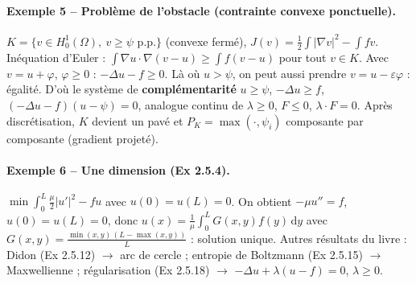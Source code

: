 \documentclass[10pt,a4paper]{article}
\newcommand{\eps}{\varepsilon}
\newcommand{\Hz}{H^1_0(\Omega)}
\begin{document}
\paragraph{Exemple 5 -- Problème de l'obstacle (contrainte convexe ponctuelle).}
$K=\{v\in\Hz,\ v\ge\psi\text{ p.p.}\}$ (convexe fermé), $J(v)=\frac12\int|\nabla v|^2-\int fv$.
Inéquation d'Euler : $\int\nabla u\cdot\nabla(v-u)\ge\int f(v-u)$ pour tout $v\in K$.
Avec $v=u+\varphi$, $\varphi\ge0$ : $-\Delta u-f\ge0$. Là où $u>\psi$, on peut aussi prendre $v=u-\eps\varphi$ : égalité.
D'où le système de \textbf{complémentarité} $u\ge\psi$, $-\Delta u\ge f$, $(-\Delta u-f)(u-\psi)=0$, analogue continu de $\lambda\ge0$, $F\le0$, $\lambda\cdot F=0$.
Après discrétisation, $K$ devient un pavé et $P_K=\max(\cdot,\psi_i)$ composante par composante (gradient projeté).

\paragraph{Exemple 6 -- Une dimension (Ex 2.5.4).} $\min\int_0^L\frac\mu2|u'|^2-fu$ avec $u(0)=u(L)=0$.
On obtient $-\mu u''=f$, $u(0)=u(L)=0$, donc $u(x)=\frac1\mu\int_0^LG(x,y)f(y)\,\mathrm dy$ avec $G(x,y)=\frac{\min(x,y)\,(L-\max(x,y))}L$ : solution unique.
Autres résultats du livre : Didon (Ex 2.5.12) $\to$ arc de cercle ; entropie de Boltzmann (Ex 2.5.15) $\to$ Maxwellienne ; régularisation (Ex 2.5.18) $\to$ $-\Delta u+\lambda(u-f)=0$, $\lambda\ge0$.

\end{document}
